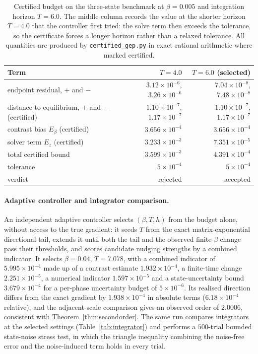 \documentclass[11pt]{article}
\theoremstyle{definition}
\theoremstyle{remark}
\begin{document}
\begin{table}[t]
\centering
\small
\caption{Certified budget on the three-state benchmark at $\beta = 0.005$ and integration horizon
$T = 6.0$. The middle column records the value at the shorter horizon $T = 4.0$ that the
controller first tried: the solve term then exceeds the tolerance, so the certificate forces a
longer horizon rather than a relaxed tolerance. All quantities are produced by
\texttt{certified\_gep.py} in exact rational arithmetic where marked certified.}
\label{tab:budget}
\begin{tabular}{lrr}
\toprule
Term & $T = 4.0$ & $T = 6.0$ (selected) \\
\midrule
endpoint residual, $+$ and $-$ & $3.12\times10^{-6}$, $3.26\times10^{-6}$ & $7.04\times10^{-8}$, $7.48\times10^{-8}$ \\
distance to equilibrium, $+$ and $-$ (certified) & $1.10\times10^{-7}$, $1.17\times10^{-7}$ & $1.10\times10^{-7}$, $1.17\times10^{-7}$ \\
contrast bias $E_\beta$ (certified) & $3.656\times10^{-4}$ & $3.656\times10^{-4}$ \\
solver term $E_z$ (certified) & $3.233\times10^{-3}$ & $7.351\times10^{-5}$ \\
total certified bound & $3.599\times10^{-3}$ & $4.391\times10^{-4}$ \\
tolerance & $5\times10^{-4}$ & $5\times10^{-4}$ \\
verdict & rejected & accepted \\
\bottomrule
\end{tabular}
\end{table}

\paragraph{Adaptive controller and integrator comparison.}
An independent adaptive controller selects $(\beta,T,h)$ from the budget alone, without access to
the true gradient: it seeds $T$ from the exact matrix-exponential directional tail, extends it
until both the tail and the observed finite-$\beta$ change pass their thresholds, and scores
candidate nudging strengths by a combined indicator. It selects $\beta = 0.04$, $T = 7.078$, with
a combined indicator of $5.995\times10^{-4}$ made up of a contrast estimate
$1.932\times10^{-4}$, a finite-time change $2.251\times10^{-5}$, a numerical indicator
$1.597\times10^{-5}$ and a state-uncertainty bound $3.679\times10^{-4}$ for a per-phase
uncertainty budget of $5\times10^{-6}$. Its realised direction differs from the exact gradient by
$1.938\times10^{-4}$ in absolute terms ($6.18\times10^{-4}$ relative), and the adjacent-scale
comparison gives an observed order of $2.0006$, consistent with Theorem~\ref{thm:secondorder}. The
same run compares integrators at the selected settings (Table~\ref{tab:integrator}) and performs a
$500$-trial bounded state-noise stress test, in which the triangle inequality combining the noise-free
error and the noise-induced term holds in every trial.
\end{document}
